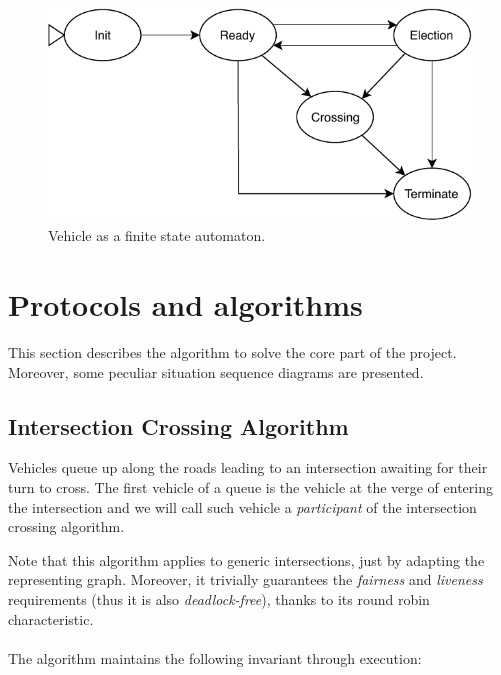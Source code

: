 \documentclass{memoir}
\begin{document}
\begin{figure}
	\centering
	\includegraphics[width=0.8\linewidth]{vehicle_automaton.pdf}
	\caption{Vehicle as a finite state automaton.}
	\label{fig:vehicle-automaton}
\end{figure}

\section{Protocols and algorithms}
This section describes the algorithm to solve the core part of the project. Moreover, some peculiar situation sequence diagrams are presented.

\subsection{Intersection Crossing Algorithm}
Vehicles queue up along the roads leading to an intersection awaiting for their turn to cross. The first vehicle of a queue is the vehicle at the verge of entering the intersection and we will call such vehicle a \emph{participant} of the intersection crossing algorithm.

Note that this algorithm applies to generic intersections, just by adapting the representing graph. Moreover, it trivially guarantees the \emph{fairness} and \emph{liveness} requirements (thus it is also \emph{deadlock-free}), thanks to its round robin characteristic.
\\\\
\noindent
The algorithm maintains the following invariant through execution:
\end{document}
